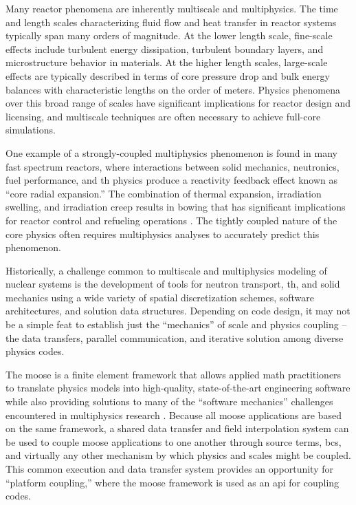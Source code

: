 \documentclass[3p,,preprint,11pt]{elsarticle}
\begin{document}
Many reactor phenomena are inherently multiscale and multiphysics. The time and length scales
characterizing fluid flow
and heat transfer in reactor systems typically span many orders of magnitude.
At the lower length scale, fine-scale effects include turbulent energy dissipation,
turbulent boundary layers, and microstructure behavior in materials.
At the higher length scales, large-scale effects are typically described in terms of core
pressure drop and bulk energy balances with characteristic lengths on the order of meters.
Physics phenomena over this broad range of scales have significant implications for
reactor design and licensing, and multiscale techniques are often necessary to
achieve full-core simulations.

One example of a strongly-coupled multiphysics phenomenon is found in
many fast spectrum reactors, where interactions between solid mechanics, neutronics, fuel performance,
and \gls{th} physics produce a reactivity feedback effect
known as ``core radial expansion.'' The combination of thermal expansion,
irradiation swelling, and irradiation creep results in bowing
that has significant implications for reactor control \cite{haroldsen,fontaine} and
refueling operations \cite{shields}.
The tightly coupled nature of the core physics often requires multiphysics analyses
to accurately predict this phenomenon.

Historically, a challenge common to multiscale and multiphysics modeling of nuclear systems
is the development of tools for neutron transport, \gls{th}, and solid mechanics
using a wide variety of spatial discretization schemes, software architectures, and
solution data structures. Depending on code design, it may not be a simple feat to establish
just the ``mechanics'' of scale and physics coupling -- the data transfers, parallel
communication, and iterative solution among diverse physics codes.

The \gls{moose} is a finite element framework that allows applied
math practitioners to translate physics models into high-quality, state-of-the-art engineering software while also providing solutions to many of the ``software mechanics'' challenges encountered in multiphysics research \cite{moose2020}. Because all \gls{moose} applications are based on the same framework, a shared data transfer
and field interpolation system can be used to couple \gls{moose} applications to one another
through source terms, \glspl{bc}, and virtually any other mechanism by which physics and scales might be coupled.
This common execution and data transfer system provides an opportunity for ``platform coupling,'' where the
\gls{moose} framework is used as an \gls{api} for coupling codes. 
\end{document}
